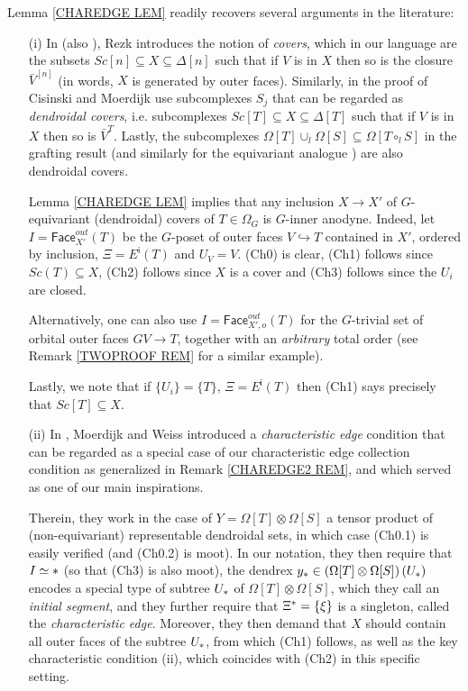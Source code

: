 \documentclass[a4paper,10pt,draft]{article}%
\begin{document}
\begin{remark} \label{RECOVER REM}
Lemma \ref{CHAREDGE LEM} readily recovers several arguments in the literature:
\begin{itemize}
\item[(i)] In \cite[\S 10]{Rez01} (also \cite[\S 6.2]{Rez10}), Rezk introduces the notion of \textit{covers}, which in our language are the subsets
$Sc[n] \subseteq X \subseteq \Delta[n]$
such that if $V$ is in $X$ then so is the closure $\bar{V}^{[n]}$
(in words, $X$ is generated by outer faces).
Similarly, in the proof of \cite[Prop. 2.4]{CM13a}
Cisinski and Moerdijk use subcomplexes $S_j$ that can be regarded as
\textit{dendroidal covers},
i.e. subcomplexes
$Sc[T] \subseteq X \subseteq \Delta[T]$
such that if $V$ is in $X$ then so is $\bar{V}^{T}$.
Lastly, the subcomplexes 
$\Omega[T] \cup_l \Omega[S] \subseteq \Omega[T \circ_l S]$
in the grafting result \cite[Lemma 5.2]{MW09} (and similarly for the equivariant analogue \cite[Prop. 6.19]{Per17}) are also dendroidal covers.

Lemma \ref{CHAREDGE LEM} implies
that any inclusion $X \to X'$ of $G$-equivariant (dendroidal) covers of $T\in \Omega_G$
is $G$-inner anodyne. 
Indeed, let $I=\mathsf{Face}_{X'}^{out}(T)$ be the $G$-poset of outer faces $V \hookrightarrow T$ contained in $X'$, ordered by inclusion, 
$\Xi = E^{\mathsf{i}}(T)$ and $U_V = V$.
(Ch0) is clear, (Ch1) follows since 
$Sc(T) \subseteq X$, (Ch2) follows since $X$ is a cover and
(Ch3) follows since the $U_i$ are closed.

Alternatively, one can also use $I=\mathsf{Face}_{X',o}^{out}(T)$
for the $G$-trivial set of orbital outer faces $GV \to T$,
together with an \textit{arbitrary} total order (see Remark \ref{TWOPROOF REM} for a similar example).

Lastly, we note that if $\{U_i\}=\{T\}$, $\Xi=E^{\mathsf{i}}(T)$
then (Ch1) says precisely that $Sc[T] \subseteq X$.


\item[(ii)] In \cite[Lemma 9.7]{MW09}, Moerdijk and Weiss introduced a \textit{characteristic edge} condition that can be regarded as a special case of our characteristic edge collection condition as generalized in Remark \ref{CHAREDGE2 REM}, and which served as one of our main inspirations.

Therein, they work in the case of $Y= \Omega[T] \otimes \Omega[S]$
a tensor product of (non-equivariant) representable dendroidal sets, in which case (Ch0.1) is easily verified (and (Ch0.2) is moot).
In our notation, they then require that $I \simeq \**$ (so that (Ch3) is also moot), 
the dendrex 
$y_{\**} \in \left(\Omega[T] \otimes \Omega[S]\right)(U_{\**})$ encodes a special type of subtree $U_{\**}$ of $\Omega[T] \otimes \Omega[S]$, which they call an \textit{initial segment},
and they further require that $\Xi^{\**} = \{\xi\}$ is a singleton, called the \textit{characteristic edge}.
Moreover, they then demand that $X$ should contain all outer faces of the subtree $U_{\**}$, from which (Ch1) follows, 
as well as the key characteristic condition 
\cite[Lemma 9.7]{MW09}(ii),
which coincides with (Ch2) in this specific setting.


\end{itemize}
\end{remark}
\end{document}
